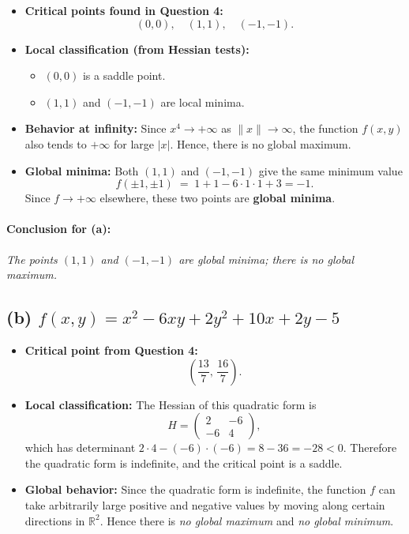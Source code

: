 \documentclass[12pt]{article}
\begin{document}
\begin{itemize}
    \item \textbf{Critical points found in Question 4:} 
          \[
             (0,0),\quad (1,1),\quad (-1,-1).
          \]
    \item \textbf{Local classification (from Hessian tests):}
    \begin{itemize}
        \item $(0,0)$ is a saddle point.
        \item $(1,1)$ and $(-1,-1)$ are local minima.
    \end{itemize}
    \item \textbf{Behavior at infinity:} 
    Since $x^4 \to +\infty$ as $\|x\|\to \infty$, the function $f(x,y)$ 
    also tends to $+\infty$ for large $|x|$. Hence, there is no global maximum.
    \item \textbf{Global minima:} 
    Both $(1,1)$ and $(-1,-1)$ give the same minimum value 
    \[
       f(\pm 1,\pm 1) \;=\; 1 + 1 - 6 \cdot 1 \cdot 1 + 3 = -1.
    \]
    Since $f \to +\infty$ elsewhere, these two points are \textbf{global minima}. 
\end{itemize}

\paragraph{Conclusion for (a):} 
\emph{The points $(1,1)$ and $(-1,-1)$ are global minima; there is no global maximum.}
\newpage
\subsection*{(b) \texorpdfstring{$f(x, y) = x^2 - 6xy + 2y^2 + 10x + 2y - 5$}{f(x, y) = x^2 - 6xy + 2y^2 + 10x + 2y - 5}}

\begin{itemize}
    \item \textbf{Critical point from Question 4:}
          \[
              \left(\frac{13}{7},\, \frac{16}{7}\right).
          \]
    \item \textbf{Local classification:} 
    The Hessian of this quadratic form is
    \[
        H = \begin{pmatrix} 2 & -6 \\ -6 & 4 \end{pmatrix},
    \]
    which has determinant $2\cdot 4 - (-6)\cdot(-6) = 8 - 36 = -28 < 0$. 
    Therefore the quadratic form is indefinite, and the critical point is a saddle.
    \item \textbf{Global behavior:} 
    Since the quadratic form is indefinite, the function $f$ can take arbitrarily 
    large positive and negative values by moving along certain directions in $\mathbb{R}^2$. 
    Hence there is \emph{no global maximum} and \emph{no global minimum}.
\end{itemize}
\end{document}

